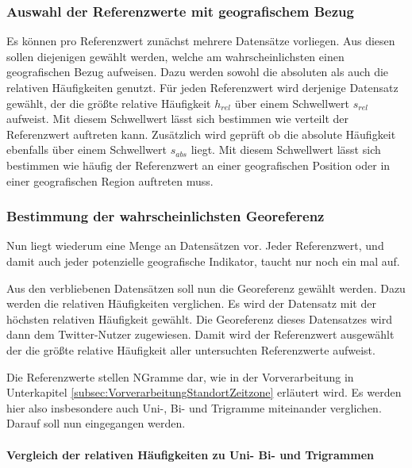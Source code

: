 			\subsubsection{Auswahl der Referenzwerte mit geografischem Bezug}

				Es können pro Referenzwert zunächst mehrere Datensätze vorliegen.
				Aus diesen sollen diejenigen gewählt werden, welche am wahrscheinlichsten einen geografischen Bezug aufweisen.
				Dazu werden sowohl die absoluten als auch die relativen Häufigkeiten genutzt. 
				Für jeden Referenzwert wird derjenige Datensatz gewählt, der die größte relative Häufigkeit $h_{rel}$ über einem Schwellwert $s_{rel}$ aufweist.
				Mit diesem Schwellwert lässt sich bestimmen wie verteilt der Referenzwert auftreten kann.
				Zusätzlich wird geprüft ob die absolute Häufigkeit ebenfalls über einem Schwellwert $s_{abs}$ liegt.
				Mit diesem Schwellwert lässt sich bestimmen wie häufig der Referenzwert an einer geografischen Position oder in einer geografischen Region auftreten muss. 

			\subsubsection{Bestimmung der wahrscheinlichsten Georeferenz} 

				Nun liegt wiederum eine Menge an Datensätzen vor.
				Jeder Referenzwert, und damit auch jeder potenzielle geografische Indikator, taucht nur noch ein mal auf. 

				Aus den verbliebenen Datensätzen soll nun die Georeferenz gewählt werden. 
				Dazu werden die relativen Häufigkeiten verglichen.
				Es wird der Datensatz mit der höchsten relativen Häufigkeit gewählt.
				Die Georeferenz dieses Datensatzes wird dann dem Twitter-Nutzer zugewiesen. 
				Damit wird der Referenzwert ausgewählt der die größte relative Häufigkeit aller untersuchten Referenzwerte aufweist. 

				Die Referenzwerte stellen NGramme dar, wie in der Vorverarbeitung in Unterkapitel \ref{subsec:VorverarbeitungStandortZeitzone} erläutert wird.
				Es werden hier also insbesondere auch Uni-, Bi- und Trigramme miteinander verglichen.
				Darauf soll nun eingegangen werden.

				\paragraph{Vergleich der relativen Häufigkeiten zu Uni- Bi- und Trigrammen}

